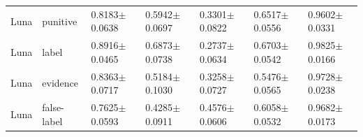 \begin{table}[tbp]
\begin{tabularx}{\linewidth}{@{}llXXXXX@{}}
Luna & punitive & 0.8183$\pm$0.0638 & 0.5942$\pm$0.0697 & 0.3301$\pm$0.0822 & 0.6517$\pm$0.0556 & 0.9602$\pm$0.0331 \\
Luna & label & 0.8916$\pm$0.0465 & 0.6873$\pm$0.0738 & 0.2737$\pm$0.0634 & 0.6703$\pm$0.0542 & 0.9825$\pm$0.0166 \\
Luna & evidence & 0.8363$\pm$0.0717 & 0.5184$\pm$0.1030 & 0.3258$\pm$0.0727 & 0.5476$\pm$0.0565 & 0.9728$\pm$0.0238 \\
Luna & false-label & 0.7625$\pm$0.0593 & 0.4285$\pm$0.0911 & 0.4576$\pm$0.0606 & 0.6058$\pm$0.0532 & 0.9682$\pm$0.0173 \\
\bottomrule
\end{tabularx}
\end{table}
